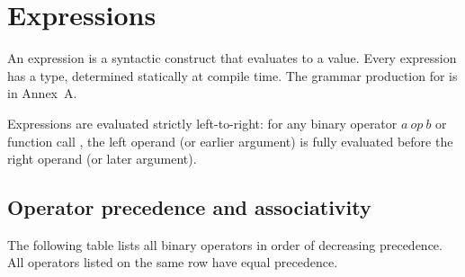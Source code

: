 \chapter{Expressions}
\label{sec:08-expressions}

\pnum
An expression is a syntactic construct that evaluates to a value.  Every
expression has a type, determined statically at compile time.  The grammar
production for  is in Annex~A.

\pnum
Expressions are evaluated strictly left-to-right: for any binary operator
$a\ \mathit{op}\ b$ or function call , the left operand
(or earlier argument) is fully evaluated before the right operand (or
later argument).

\section{Operator precedence and associativity}
\label{sec:expr.precedence}

\pnum
The following table lists all binary operators in order of decreasing
precedence.  All operators listed on the same row have equal precedence.

